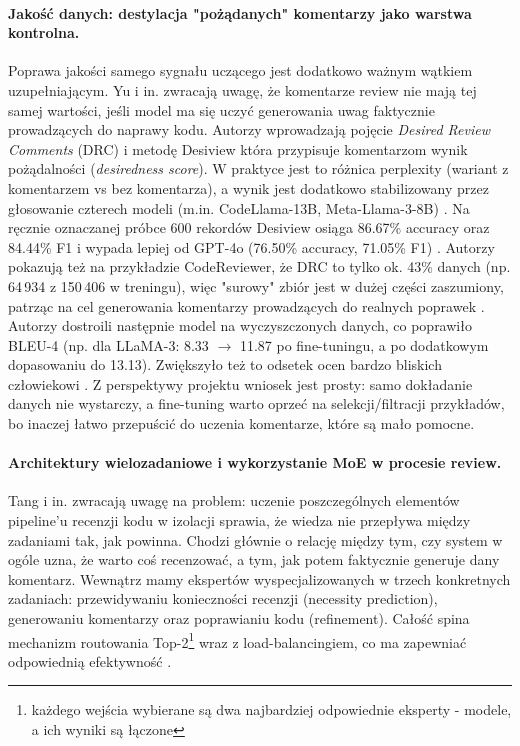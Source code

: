 \paragraph{Jakość danych: destylacja "pożądanych" komentarzy jako warstwa kontrolna.}
Poprawa jakości samego sygnału uczącego jest dodatkowo ważnym wątkiem uzupełniającym. Yu i in. zwracają uwagę, że
komentarze review nie mają tej samej wartości, jeśli model ma się uczyć generowania uwag faktycznie prowadzących do
naprawy kodu. Autorzy wprowadzają pojęcie \emph{Desired Review Comments} (DRC) i metodę Desiview która przypisuje komentarzom
wynik pożądalności (\emph{desiredness score}). W praktyce jest to różnica perplexity (wariant z komentarzem vs bez komentarza), 
a wynik jest dodatkowo stabilizowany przez głosowanie czterech modeli (m.in. CodeLlama-13B, Meta-Llama-3-8B) 
\cite{Yu2025Desiview}. Na ręcznie oznaczanej próbce 600 rekordów Desiview osiąga 86.67\% accuracy oraz 
84.44\% F1 i wypada lepiej od GPT-4o (76.50\% accuracy, 71.05\% F1) \cite{Yu2025Desiview}. Autorzy pokazują też na przykładzie CodeReviewer,
że DRC to tylko ok. 43\% danych (np. 64\,934 z 150\,406 w treningu), więc "surowy" zbiór 
jest w dużej części zaszumiony, patrząc na cel generowania komentarzy prowadzących do 
realnych poprawek \cite{Yu2025Desiview}. Autorzy dostroili następnie model na wyczyszczonych danych, co poprawiło
BLEU-4 (np. dla LLaMA-3: 8.33 \(\rightarrow\) 11.87 po fine-tuningu, a po dodatkowym dopasowaniu do 13.13). Zwiększyło
też to odsetek ocen bardzo bliskich człowiekowi \cite{Yu2025Desiview}. Z perspektywy projektu wniosek jest prosty: samo dokładanie danych nie wystarczy,
a fine-tuning warto oprzeć na selekcji/filtracji przykładów, bo inaczej łatwo przepuścić do uczenia komentarze, które są mało 
pomocne.

\paragraph{Architektury wielozadaniowe i wykorzystanie MoE w procesie review.}
Tang i in. zwracają uwagę na problem: uczenie poszczególnych elementów pipeline'u 
recenzji kodu w izolacji sprawia, że wiedza nie przepływa między zadaniami tak, 
jak powinna. Chodzi głównie o relację między tym, czy system w ogóle uzna, że warto coś recenzować, a tym, jak potem faktycznie generuje 
dany komentarz. Wewnątrz mamy ekspertów wyspecjalizowanych w trzech konkretnych zadaniach: przewidywaniu konieczności recenzji (necessity 
prediction), generowaniu komentarzy oraz poprawianiu kodu (refinement). Całość spina mechanizm routowania Top-2\footnote{każdego wejścia wybierane są dwa najbardziej odpowiednie eksperty - modele, a ich wyniki są łączone}
wraz z load-balancingiem, co ma zapewniać odpowiednią efektywność \cite{Tang2025MoEReviewer}. 

